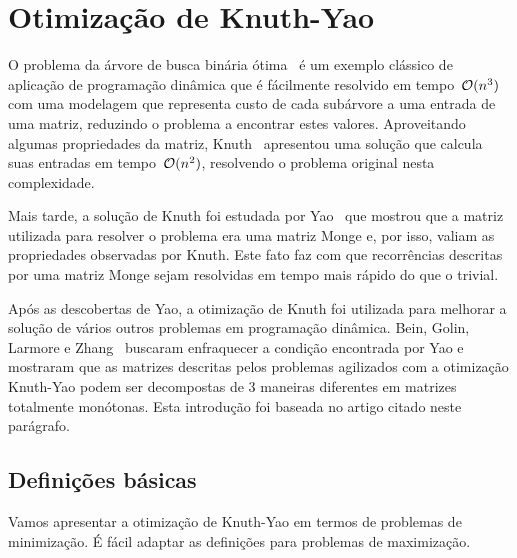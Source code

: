 \section{Otimização de Knuth-Yao}
\label{KY}


O problema da árvore de busca binária ótima~\cite{CLRS} é um exemplo clássico de aplicação de programação dinâmica que é fácilmente resolvido em tempo~$\mathcal{O}(n^3)$ com uma modelagem que representa custo de cada subárvore a uma entrada de uma matriz, reduzindo o problema a encontrar estes valores. Aproveitando algumas propriedades da matriz, Knuth~\cite{Knuth:1971} apresentou uma solução que calcula suas entradas em tempo~$\mathcal{O}(n^2)$, resolvendo o problema original nesta complexidade.

Mais tarde, a solução de Knuth foi estudada por Yao~\cite{Yao:1980,Yao:1982} que mostrou que a matriz utilizada para resolver o problema era uma matriz Monge e, por isso, valiam as propriedades observadas por Knuth. Este fato faz com que recorrências descritas por uma matriz Monge sejam resolvidas em tempo mais rápido do que o trivial.

Após as descobertas de Yao, a otimização de Knuth foi utilizada para melhorar a solução de vários outros problemas em programação dinâmica. Bein, Golin, Larmore e Zhang~\cite{Bein:2009} buscaram enfraquecer a condição encontrada por Yao e mostraram que as matrizes descritas pelos problemas agilizados com a otimização Knuth-Yao podem ser decompostas de 3 maneiras diferentes em matrizes totalmente monótonas. Esta introdução foi baseada no artigo citado neste parágrafo.


\subsection{Definições básicas}

Vamos apresentar a otimização de Knuth-Yao em termos de problemas de minimização. É fácil adaptar as definições para problemas de maximização.

